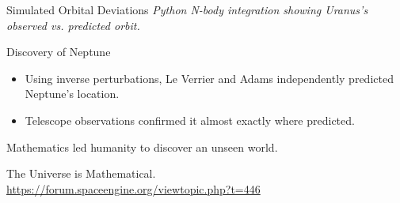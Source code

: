 \documentclass[aspectratio=169]{beamer}
\begin{document}
	\begin{frame}{Simulated Orbital Deviations}
		\centering
		\vspace{0.5em}
		\textit{Python N-body integration showing Uranus’s observed vs. predicted orbit.}
	\end{frame}
	
	\begin{frame}{Discovery of Neptune}
		\begin{itemize}
			\item Using inverse perturbations, Le Verrier and Adams independently predicted Neptune’s location.
			\item Telescope observations confirmed it almost exactly where predicted.
		\end{itemize}
		\vspace{0.5em}
		\alert{Mathematics led humanity to discover an unseen world.}
	\end{frame}
	
	\begin{frame}[standout]
		\Huge The Universe is Mathematical.\\[1em]
		\small \url{https://forum.spaceengine.org/viewtopic.php?t=446}
	\end{frame}
	
\end{document}
